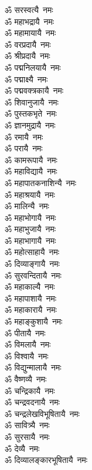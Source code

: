 \begin{multicols}{2}
\begin{flushleft}
ॐ सरस्वत्यै~नमः\\
ॐ महाभद्रायै~नमः\\
ॐ महामायायै~नमः\\
ॐ वरप्रदायै~नमः\\
ॐ श्रीप्रदायै~नमः\\
ॐ पद्मनिलयायै~नमः\\
ॐ पद्माक्ष्यै~नमः\\
ॐ पद्मवक्त्रकायै~नमः\\
ॐ शिवानुजायै~नमः\\
ॐ पुस्तकभृते~नमः\hfill{}\\
ॐ ज्ञानमुद्रायै~नमः\\
ॐ रमायै~नमः\\
ॐ परायै~नमः\\
ॐ कामरूपायै~नमः\\
ॐ महाविद्यायै~नमः\\
ॐ महापातकनाशिन्यै~नमः\\
ॐ महाश्रयायै~नमः\\
ॐ मालिन्यै~नमः\\
ॐ महाभोगायै~नमः\\
ॐ महाभुजायै~नमः\hfill{}\\
ॐ महाभागायै~नमः\\
ॐ महोत्साहायै~नमः\\
ॐ दिव्याङ्गायै~नमः\\
ॐ सुरवन्दितायै~नमः\\
ॐ महाकाल्यै~नमः\\
ॐ महापाशायै~नमः\\
ॐ महाकारायै~नमः\\
ॐ महाङ्कुशायै~नमः\\
ॐ पीतायै~नमः\\
ॐ विमलायै~नमः\hfill{}\\
ॐ विश्वायै~नमः\\
ॐ विद्युन्मालायै~नमः\\
ॐ वैष्णव्यै~नमः\\
ॐ चन्द्रिकायै~नमः\\
ॐ चन्द्रवदनायै~नमः\\
ॐ चन्द्रलेखविभूषितायै~नमः\\
ॐ सावित्र्यै~नमः\\
ॐ सुरसायै~नमः\\
ॐ देव्यै~नमः\\
ॐ दिव्यालङ्कारभूषितायै~नमः\hfill{}\\

\end{flushleft}
\end{multicols}
